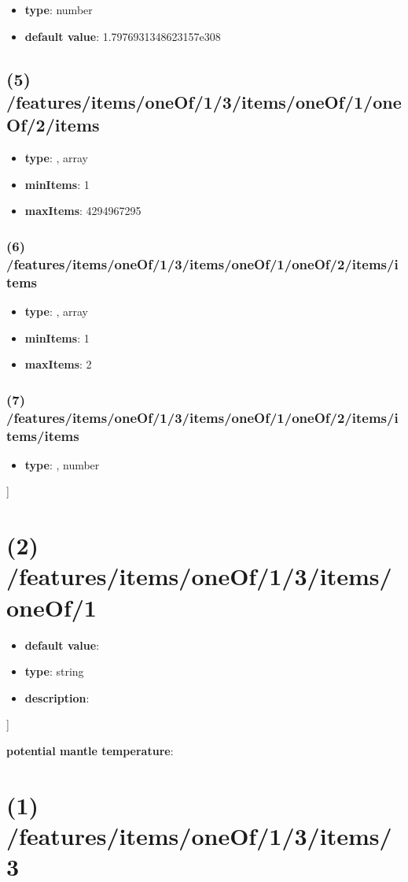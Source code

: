 \begin{itemize}[leftmargin=6em]\item {\bf type}: number\item {\bf default value}: 1.7976931348623157e308
\end{itemize}\subsection{(5) /features/items/oneOf/1/3/items/oneOf/1/oneOf/2/items}
\begin{itemize}[leftmargin=5em]\item {\bf type}: , array\item {\bf minItems}: 1
\item {\bf maxItems}: 4294967295
\end{itemize}\subsubsection{(6) /features/items/oneOf/1/3/items/oneOf/1/oneOf/2/items/items}
\begin{itemize}[leftmargin=6em]\item {\bf type}: , array\item {\bf minItems}: 1
\item {\bf maxItems}: 2
\end{itemize}\subsubsection{(7) /features/items/oneOf/1/3/items/oneOf/1/oneOf/2/items/items/items}
\begin{itemize}[leftmargin=7em]\item {\bf type}: , number\end{itemize}]\section{(2) /features/items/oneOf/1/3/items/oneOf/1}
\begin{itemize}[leftmargin=2em]\item {\bf default value}: 
\item {\bf type}: string
\item {\bf description}: 
\end{itemize}]\item {\bf potential mantle temperature}: \section{(1) /features/items/oneOf/1/3/items/3}
